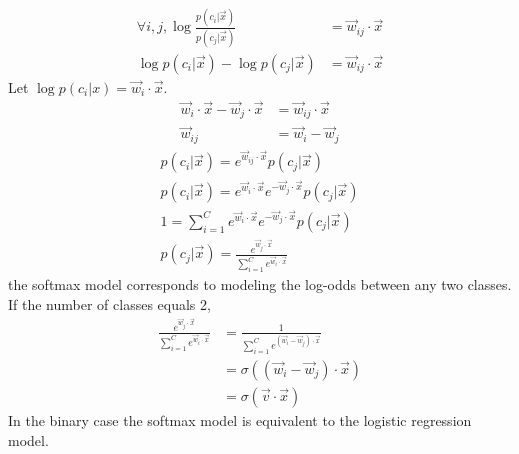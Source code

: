 \documentclass{introtosml}
\newcommand{\x}{\vec{x}}
\newcommand{\w}{\vec{w}}
\begin{document}
\begin{p}
  \item
    \begin{align*}
      \forall i, j, \log \frac{p(c_i|\x)}{p(c_j|\x)} & = \w_{ij} \cdot \x \\
      \log p(c_i|\x) - \log p(c_j|\x) & = \w_{ij} \cdot \x
    \end{align*}
    Let $\log p(c_i|x) = \w_i \cdot \x$.
    \begin{align*}
      \w_i \cdot \x - \w_j \cdot \x & = \w_{ij} \cdot \x \\
      \w_{ij} & = \w_i - \w_j
    \end{align*}
    \begin{align*}
      p(c_i|\x) = e^{\w_{ij} \cdot \x} p(c_j|\x) \\
      p(c_i|\x) = e^{\w_i \cdot \x} e^{- \w_j \cdot \x} p(c_j|\x) \\
      1 = \sum_{i=1}^C e^{\w_i \cdot \x} e^{- \w_j \cdot \x} p(c_j|\x) \\
      p(c_j|\x) = \frac{e^{\w_j \cdot \x}}{\sum_{i=1}^C e^{\w_i \cdot \x}}
    \end{align*}
    \therefore the softmax model corresponds to modeling the log-odds
    between any two classes. \\
    If the number of classes equals 2,
    \begin{align*}
      \frac{e^{\w_j \cdot \x}}{\sum_{i=1}^C e^{\w_i \cdot \x}}
      & = \frac{1}{\sum_{i=1}^C e^{(\w_i - \w_j) \cdot \x}} \\
      & = \sigma((\w_i - \w_j) \cdot \x) \\
      & = \sigma(\vec{v} \cdot \x)
    \end{align*}
    \therefore In the binary case the softmax model is equivalent
    to the logistic regression model.


\end{p}
\end{document}

